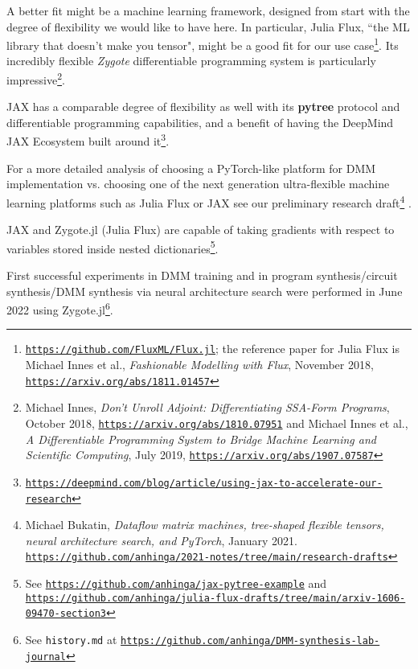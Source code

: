 \documentclass{article}
\begin{document}
A better fit might be a machine learning framework, designed from start with the degree of flexibility
we would like to have here. In particular, Julia Flux, ``the ML library that doesn't make you tensor", might be a good fit
for our use case\footnote{\href{https://github.com/FluxML/Flux.jl}{\tt https://github.com/FluxML/Flux.jl};
the reference paper for Julia Flux is Michael Innes et al., {\em Fashionable Modelling with Flux}, November 2018,
\href{https://arxiv.org/abs/1811.01457}{\tt https://arxiv.org/abs/1811.01457}}. Its incredibly flexible {\em Zygote}
differentiable programming system is particularly impressive\footnote{Michael Innes,
{\em Don't Unroll Adjoint: Differentiating SSA-Form Programs}, October 2018,
\href{https://arxiv.org/abs/1810.07951}{\tt https://arxiv.org/abs/1810.07951} and 
Michael Innes et al., {\em A Differentiable Programming System to Bridge Machine Learning and Scientific Computing}, 
July 2019, \href{https://arxiv.org/abs/1907.07587}{\tt https://arxiv.org/abs/1907.07587}}.

JAX has a comparable degree of flexibility as well with its {\bf pytree} protocol and differentiable programming capabilities,
and a benefit of having the DeepMind JAX Ecosystem built around 
it\footnote{\href{https://deepmind.com/blog/article/using-jax-to-accelerate-our-research}
{\tt https://deepmind.com/blog/article/using-jax-to-accelerate-our-research}}. 

For a more detailed analysis of choosing a PyTorch-like platform for DMM implementation vs. choosing one of the next generation ultra-flexible
machine learning platforms such as Julia Flux or JAX see our preliminary research 
draft\footnote{Michael Bukatin, {\em Dataflow matrix machines, tree-shaped flexible tensors, neural architecture search, 
and PyTorch}, January 2021. \href{https://github.com/anhinga/2021-notes/tree/main/research-drafts}
{\tt https://github.com/anhinga/2021-notes/tree/main/research-drafts}} . 

JAX and Zygote.jl (Julia Flux) are capable of taking gradients with respect to variables stored inside 
nested dictionaries\footnote{See \href{https://github.com/anhinga/jax-pytree-example}{\tt https://github.com/anhinga/jax-pytree-example}
and\\ \href{https://github.com/anhinga/julia-flux-drafts/tree/main/arxiv-1606-09470-section3}
{\tt https://github.com/anhinga/julia-flux-drafts/tree/main/arxiv-1606-09470-section3}}.

First successful experiments in DMM training and in program synthesis/circuit synthesis/DMM synthesis via neural architecture search
were performed in June 2022 using Zygote.jl\footnote{See {\tt history.md} at
\href{https://github.com/anhinga/DMM-synthesis-lab-journal}{\tt https://github.com/anhinga/DMM-synthesis-lab-journal}}.
\end{document}
